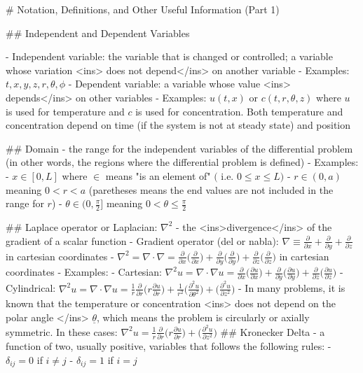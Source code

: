 # Notation, Definitions, and Other Useful Information (Part 1)

## Independent and Dependent Variables

- Independent variable: the variable that is changed or controlled; a variable whose variation <ins> does not depend</ins> on another variable  
    - Examples: $t, x, y, z, r, \theta, \phi$  
- Dependent variable: a variable whose value <ins> depends</ins> on other variables  
    - Examples: $u(t,x)$ or $c(t,r, \theta, z)$ where $u$ is used for temperature and $c$ is used for concentration. Both temperature and concentration depend on time (if the system is not at steady state) and position 

## Domain
- the range for the independent variables of the differential problem (in other words, the regions where the differential problem is defined)  
    - Examples:
        - $x \in [0,L]$ where $\in$ means "is an element of" $\big($ i.e. $0 \leq x \leq L \big)$
        - $r \in (0,a)$ meaning $0 < r < a$ (paretheses means the end values are not included in the range for $r$)
        - $\theta \in (0,\frac{\pi}{2}]$ meaning $0 < \theta \leq \frac{\pi}{2}$  

## Laplace operator or Laplacian: $\nabla^2$
- the <ins>divergence</ins> of the gradient of a scalar function
    - Gradient operator (del or nabla): $\nabla \equiv \frac{\partial}{\partial x} + \frac{\partial}{\partial y} + \frac{\partial}{\partial z}$ in cartesian coordinates 
- $\nabla^2 = \nabla \cdot \nabla = \frac{\partial}{\partial x} \big(\frac{\partial}{\partial x}\big) + \frac{\partial}{\partial y} \big(\frac{\partial}{\partial y}\big) + \frac{\partial}{\partial z} \big(\frac{\partial}{\partial z}\big)$ in cartesian coordinates
    - Examples: 
        - Cartesian: $\nabla^2 u = \nabla \cdot \nabla u = \frac{\partial}{\partial x} \big(\frac{\partial u}{\partial x}\big) + \frac{\partial}{\partial y} \big(\frac{\partial u}{\partial y}\big) + \frac{\partial}{\partial z} \big(\frac{\partial u}{\partial z}\big)$
        - Cylindrical: $\nabla^2 u = \nabla \cdot \nabla u = \frac{1}{r}\frac{\partial}{\partial r} \big(r \frac{\partial u}{\partial r}\big) + \frac{1}{r^2} \big(\frac{\partial^2 u}{\partial \theta^2}\big) + \big(\frac{\partial^2 u}{\partial z^2}\big)$
            - In many problems, it is known that the temperature or concentration <ins> does not depend on the polar angle </ins> $\underline{\theta}$, which means the problem is circularly or axially symmetric. In these cases: $\nabla^2 u = \frac{1}{r}\frac{\partial}{\partial r} \big(r \frac{\partial u}{\partial r}\big) + \big(\frac{\partial^2 u}{\partial z^2}\big)$
## Kronecker Delta
- a function of two, usually positive, variables that follows the following rules:
    - $\delta_{ij} = 0$ if $i \neq j$
    - $\delta_{ij} = 1$ if $i = j$

